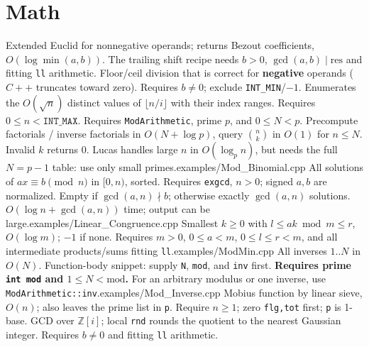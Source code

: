 \section{Math}
%
{Extended Euclid for nonnegative operands; returns Bezout coefficients, $O(\log\min(a,b))$. The trailing shift recipe needs $b>0$, $\gcd(a,b)\mid\mathrm{res}$ and fitting \texttt{ll} arithmetic.}
%
{Floor/ceil division that is correct for \textbf{negative} operands ($C++$ truncates toward zero). Requires $b\ne0$; exclude \texttt{INT\_MIN}/$-1$.}
%
{Enumerates the $O(\sqrt n)$ distinct values of $\lfloor n/i\rfloor$ with their index ranges. Requires $0\le n<\texttt{INT\_MAX}$.}
%
{Requires \texttt{ModArithmetic}, prime $p$, and $0\le N<p$. Precompute factorials / inverse factorials in $O(N+\log p)$, query $\binom nk$ in $O(1)$ for $n\le N$. Invalid $k$ returns 0. Lucas handles large $n$ in $O(\log_p n)$, but needs the full $N=p-1$ table: use only small primes.}{examples/Mod_Binomial.cpp}
%
{All solutions of $ax\equiv b\pmod n$ in $[0,n)$, sorted. Requires \texttt{exgcd}, $n>0$; signed $a,b$ are normalized. Empty if $\gcd(a,n)\nmid b$; otherwise exactly $\gcd(a,n)$ solutions. $O(\log n+\gcd(a,n))$ time; output can be large.}{examples/Linear_Congruence.cpp}
%
{Smallest $k\ge0$ with $l\le ak\bmod m\le r$, $O(\log m)$; $-1$ if none. Requires $m>0$, $0\le a<m$, $0\le l\le r<m$, and all intermediate products/sums fitting \texttt{ll}.}{examples/ModMin.cpp}
%
{All inverses $1..N$ in $O(N)$. Function-body snippet: supply \texttt{N}, \texttt{mod}, and \texttt{inv} first. \textbf{Requires prime \texttt{int mod} and $1\le N<\mathrm{mod}$.} For an arbitrary modulus or one inverse, use \texttt{ModArithmetic::inv}.}{examples/Mod_Inverse.cpp}
%
{Mobius function by linear sieve, $O(n)$; also leaves the prime list in \texttt{p}. Require $n\ge1$; zero \texttt{flg,tot} first; \texttt{p} is 1-base.}
%
{GCD over $\mathbb{Z}[i]$; local \texttt{rnd} rounds the quotient to the nearest Gaussian integer. Requires $b\ne0$ and fitting \texttt{ll} arithmetic.}
%

